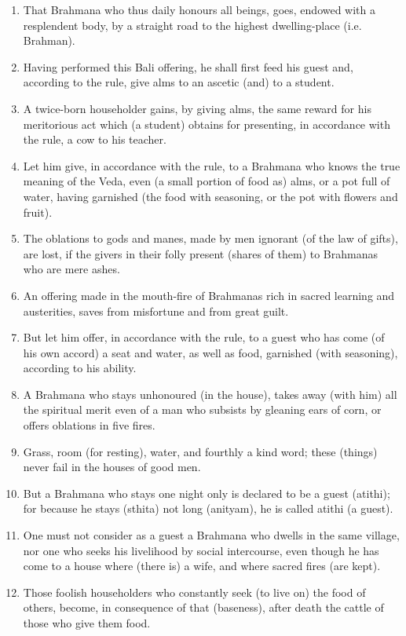 \begin{enumerate}
\item That Brahmana who thus daily honours all beings, goes, endowed with a resplendent body, by a straight road to the highest dwelling-place (i.e. Brahman).
\item Having performed this Bali offering, he shall first feed his guest and, according to the rule, give alms to an ascetic (and) to a student.
\item A twice-born householder gains, by giving alms, the same reward for his meritorious act which (a student) obtains for presenting, in accordance with the rule, a cow to his teacher.
\item Let him give, in accordance with the rule, to a Brahmana who knows the true meaning of the Veda, even (a small portion of food as) alms, or a pot full of water, having garnished (the food with seasoning, or the pot with flowers and fruit).
\item The oblations to gods and manes, made by men ignorant (of the law of gifts), are lost, if the givers in their folly present (shares of them) to Brahmanas who are mere ashes.
\item An offering made in the mouth-fire of Brahmanas rich in sacred learning and austerities, saves from misfortune and from great guilt.
\item But let him offer, in accordance with the rule, to a guest who has come (of his own accord) a seat and water, as well as food, garnished (with seasoning), according to his ability.
\item A Brahmana who stays unhonoured (in the house), takes away (with him) all the spiritual merit even of a man who subsists by gleaning ears of corn, or offers oblations in five fires.
\item Grass, room (for resting), water, and fourthly a kind word; these (things) never fail in the houses of good men.
\item But a Brahmana who stays one night only is declared to be a guest (atithi); for because he stays (sthita) not long (anityam), he is called atithi (a guest).
\item One must not consider as a guest a Brahmana who dwells in the same village, nor one who seeks his livelihood by social intercourse, even though he has come to a house where (there is) a wife, and where sacred fires (are kept).
\item Those foolish householders who constantly seek (to live on) the food of others, become, in consequence of that (baseness), after death the cattle of those who give them food.

\end{enumerate}
